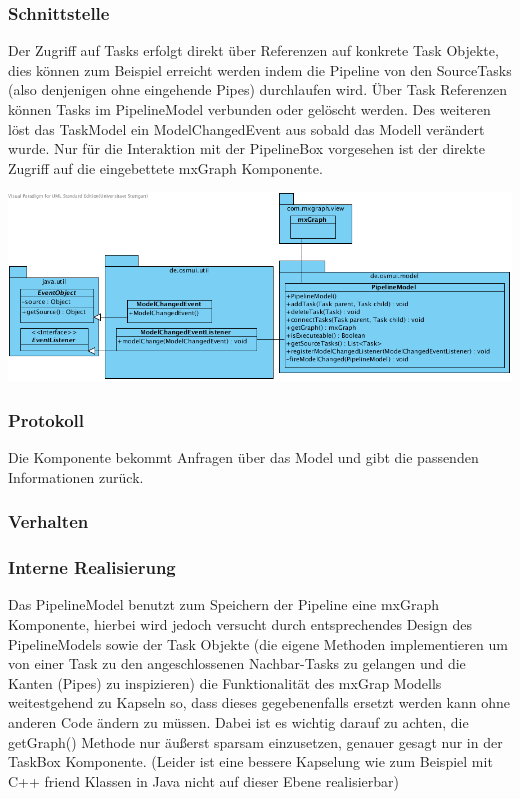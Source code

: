 \documentclass[a4paper,12pt]{scrartcl}
\begin{document}
\subsubsection{Schnittstelle}
Der Zugriff auf Tasks erfolgt direkt über Referenzen auf konkrete Task Objekte, dies können zum Beispiel erreicht werden
indem die Pipeline von den SourceTasks (also denjenigen ohne eingehende Pipes) durchlaufen wird. Über Task Referenzen können Tasks im PipelineModel verbunden oder gelöscht werden. Des weiteren löst das TaskModel ein ModelChangedEvent aus sobald das Modell verändert wurde. Nur für die Interaktion mit der PipelineBox vorgesehen ist der direkte Zugriff auf die eingebettete mxGraph Komponente.
\begin{center}
\includegraphics[width=17cm]{Schnittstelle_PipelineModel.png}
\end{center}
\subsubsection{Protokoll}
Die Komponente bekommt Anfragen über das Model und gibt die passenden Informationen zurück.
\subsubsection{Verhalten}
\subsubsection{Interne Realisierung}
Das PipelineModel benutzt zum Speichern der Pipeline eine mxGraph Komponente, hierbei wird jedoch versucht durch entsprechendes Design des PipelineModels sowie der Task Objekte (die eigene Methoden implementieren um von einer Task zu
den angeschlossenen Nachbar-Tasks zu gelangen und die Kanten (Pipes) zu inspizieren) die Funktionalität des mxGrap Modells
weitestgehend zu Kapseln so, dass dieses gegebenenfalls ersetzt werden kann ohne anderen Code ändern zu müssen.
Dabei ist es wichtig darauf zu achten, die getGraph() Methode nur äußerst sparsam einzusetzen, genauer gesagt nur in der TaskBox Komponente. (Leider ist eine bessere Kapselung wie zum Beispiel mit C++ friend Klassen in Java nicht auf dieser Ebene realisierbar)
\end{document}
